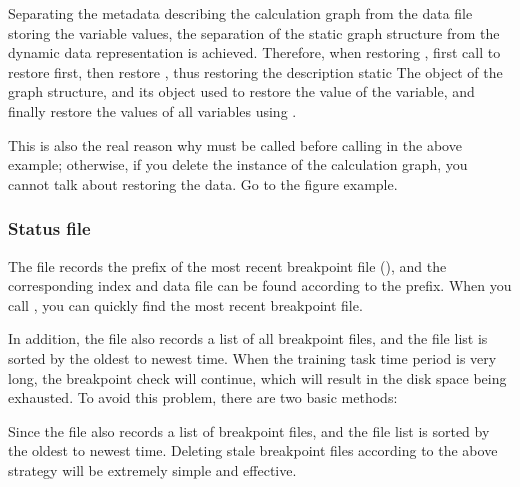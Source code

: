 \begin{content}
Separating the metadata describing the calculation graph from the data file storing the variable values, the separation of the static graph structure from the dynamic data representation is achieved. Therefore, when restoring , first call  to restore  first, then restore , thus restoring the description static The  object of the graph structure, and its  object used to restore the value of the variable, and finally restore the values ​​of all variables using .

This is also the real reason why  must be called before calling  in the above example; otherwise, if you delete the instance of the calculation graph, you cannot talk about restoring the data. Go to the figure example.


\subsubsection{Status file}
The  file records the prefix of the most recent breakpoint file (), and the corresponding index and data file can be found according to the prefix. When you call , you can quickly find the most recent breakpoint file.

In addition, the  file also records a list of all breakpoint files, and the file list is sorted by the oldest to newest time. When the training task time period is very long, the breakpoint check will continue, which will result in the disk space being exhausted. To avoid this problem, there are two basic methods:

\begin{enum}
\end{enum}

Since the  file also records a list of breakpoint files, and the file list is sorted by the oldest to newest time. Deleting stale breakpoint files according to the above strategy will be extremely simple and effective.



\end{content}
